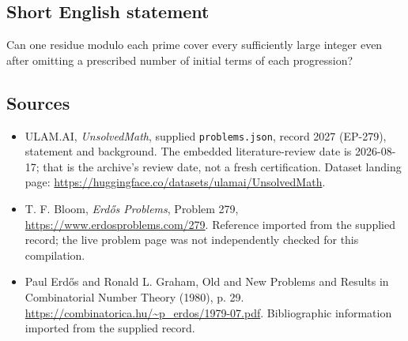 \documentclass[11pt,a4paper]{article}
\begin{document}
\subsection{Short English statement}

Can one residue modulo each prime cover every sufficiently large integer even after omitting a prescribed number of initial terms of each progression?

\subsection{Sources}

{\small

\begin{itemize}

\item[\hypertarget{source:2027:1}{S1}] ULAM.AI, \emph{UnsolvedMath}, supplied \texttt{problems.json}, record 2027 (EP-279), statement and background. The embedded literature-review date is 2026-08-17; that is the archive’s review date, not a fresh certification. Dataset landing page: \url{https://huggingface.co/datasets/ulamai/UnsolvedMath}.

\item[\hypertarget{source:2027:2}{S2}] T. F. Bloom, \emph{Erdős Problems}, Problem 279, \url{https://www.erdosproblems.com/279}. Reference imported from the supplied record; the live problem page was not independently checked for this compilation.

\item[\hypertarget{source:2027:3}{S3}] Paul Erdős and Ronald L. Graham, Old and New Problems and Results in Combinatorial Number Theory (1980), p. 29. \url{https://combinatorica.hu/~p_erdos/1979-07.pdf}. Bibliographic information imported from the supplied record.

\end{itemize}

}

\label{end:2027}
\end{document}
